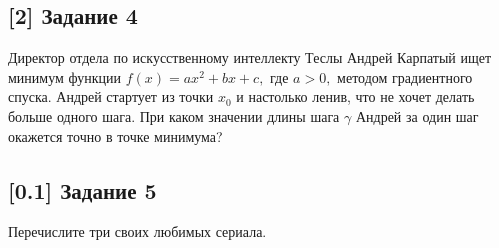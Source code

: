 \documentclass[12pt, a4paper, oneside]{article}
\begin{document}
\vspace{-0.7cm}
\subsection*{[2] Задание 4}
\vspace{-0.5cm}
Директор отдела по искусственному интеллекту Теслы Андрей Карпатый ищет минимум функции $f(x) = ax^2 + bx +c,$ где $a > 0,$ методом градиентного спуска. Андрей стартует из точки $x_0$ и настолько ленив, что не хочет делать больше одного шага. При каком значении длины шага $\gamma$ Андрей за один шаг окажется точно в точке минимума? 

\vspace{-0.5cm}
\subsection*{[0.1] Задание 5}
\vspace{-0.5cm}
Перечислите три своих любимых сериала. 
\end{document}
